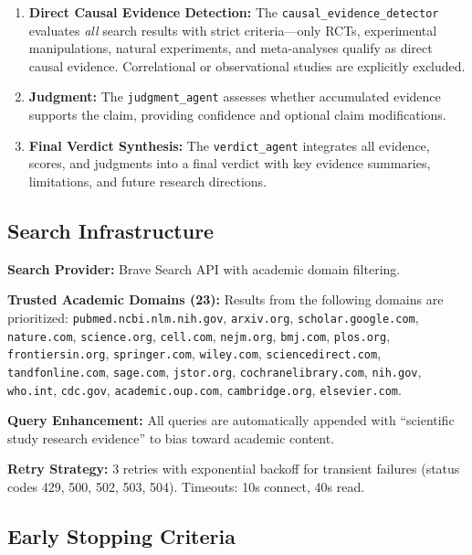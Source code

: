 \begin{enumerate}[noitemsep]
    \item \textbf{Direct Causal Evidence Detection:} The \texttt{causal\_evidence\_detector} evaluates \textit{all} search results with strict criteria---only RCTs, experimental manipulations, natural experiments, and meta-analyses qualify as direct causal evidence. Correlational or observational studies are explicitly excluded.
    
    \item \textbf{Judgment:} The \texttt{judgment\_agent} assesses whether accumulated evidence supports the claim, providing confidence and optional claim modifications.
    
    \item \textbf{Final Verdict Synthesis:} The \texttt{verdict\_agent} integrates all evidence, scores, and judgments into a final verdict with key evidence summaries, limitations, and future research directions.
\end{enumerate}

\subsection{Search Infrastructure}

\textbf{Search Provider:} Brave Search API with academic domain filtering.

\textbf{Trusted Academic Domains (23):} Results from the following domains are prioritized: \texttt{pubmed.ncbi.nlm.nih.gov}, \texttt{arxiv.org}, \texttt{scholar.google.com}, \texttt{nature.com}, \texttt{science.org}, \texttt{cell.com}, \texttt{nejm.org}, \texttt{bmj.com}, \texttt{plos.org}, \texttt{frontiersin.org}, \texttt{springer.com}, \texttt{wiley.com}, \texttt{sciencedirect.com}, \texttt{tandfonline.com}, \texttt{sage.com}, \texttt{jstor.org}, \texttt{cochranelibrary.com}, \texttt{nih.gov}, \texttt{who.int}, \texttt{cdc.gov}, \texttt{academic.oup.com}, \texttt{cambridge.org}, \texttt{elsevier.com}.

\textbf{Query Enhancement:} All queries are automatically appended with ``scientific study research evidence'' to bias toward academic content.

\textbf{Retry Strategy:} 3 retries with exponential backoff for transient failures (status codes 429, 500, 502, 503, 504). Timeouts: 10s connect, 40s read.

\subsection{Early Stopping Criteria}

